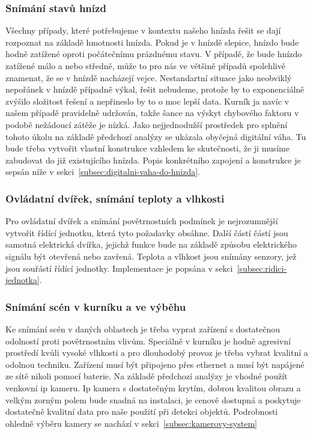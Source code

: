 \subsubsection{Snímání stavů hnízd}
Všechny případy, které potřebujeme v kontextu našeho hnízda řešit se dají rozpoznat na základě hmotnosti hnízda.
Pokud je v hnízdě slepice, hnízdo bude hodně zatížené oproti počátečnímu prázdnému stavu.
V případě, že bude hnízdo zatížené málo a nebo středně, může to pro nás ve většině případů spolehlivě znamenat, že se v hnízdě nacházejí vejce.
Nestandartní situace jako neobviklý nepořánek v hnízdě případně výkal, řešit nebudeme, protože by to exponenciálně zvýšilo složitost řešení a nepřineslo by to o moc lepší data.
Kurník ja navíc v našem případě pravidelně udržován, takže šance na výskyt chybového faktoru v podobě nežádoucí zátěže je nízká.
Jako nejjednodužší prostředek pro splnění tohoto úkolu na základě předchozí analýzy se ukázala obyčejná digitální váha.
Tu bude třeba vytvořit vlastní konstrukce vzhledem ke skutečnosti, že ji musíme zabudovat do již existujícího hnízda.
Popis konkrétního zapojení a konstrukce je sepsán níže v sekci~\ref{subsec:digitalni-vaha-do-hnizda}.

\subsubsection{Ovládatní dvířek, snímání teploty a vlhkosti}
Pro ovládatní dvířek a snímání povětrnostních podmínek je nejrozumnější vytvořit řídící jednotku, která tyto požadavky obsáhne.
Další částí částí jsou samotná elektrická dvířka, jejichž funkce bude na základě způsobu elektrického signálu být otevřená nebo zavřená.
Teplota a vlhkost jsou snímány senzory, jež jsou souřástí řídící jednotky.
Implementace je popsána v sekci~\ref{subsec:ridici-jednotka}.
\subsubsection{Snímání scén v kurníku a ve výběhu}
Ke snímání scén v daných oblastech je třeba vyprat zařízení s dostatečnou odolností proti povětrnostním vlivům.
Speciálně v kurníku je hodně agresivní prostředí kvůli vysoké vlhkosti a pro dlouhodobý provoz je třeba vybrat kvalitní a odolnou techniku.
Zařízení musí být připojeno přes ethernet a musí být napájené ze sítě nikoli pomocí baterie.
Na základě předchozí analýzy je vhodné použít venkovní ip kameru.
Ip kamera s dostatečným krytím, dobrou kvalitou obrazu a velkým zorným polem bude snadná na instalaci, je cenově dostupná a poskytuje dostatečně kvalitní data pro naše použití při detekci objektů.
Podrobnosti ohledně výběru kamery se nachází v sekci~\ref{subsec:kamerovy-system}

